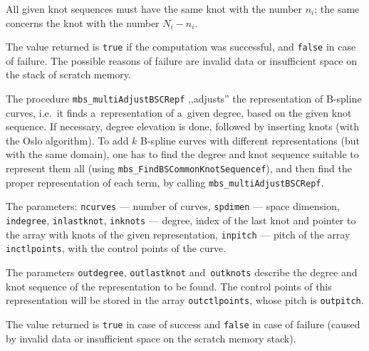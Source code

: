 All given knot sequences must have the same knot with the number $n_i$;
the same concerns the knot with the number $N_i-n_i$.

The value returned is \texttt{true} if the computation was successful,
and \texttt{false} in case of failure. The possible reasons of failure are
invalid data or insufficient space on the stack of scratch memory.

\vspace{\bigskipamount}
The procedure \texttt{mbs\_multiAdjustBSCRepf} ,,adjusts'' the
representation of B-spline curves, i.e.\ it finds a~representation of
a~given degree, based on the given knot sequence. If necessary,
degree elevation is done, followed by inserting knots (with the Oslo
algorithm). To add $k$ B-spline curves with different representations
(but with the same domain), one has to find the degree and knot sequence
suitable to represent them all (using
\texttt{mbs\_FindBSCommonKnotSequencef}), and then find the proper
representation of each term, by calling
\texttt{mbs\_multiAdjustBSCRepf}.

The parameters: \texttt{ncurves} --- number of curves, \texttt{spdimen} ---
space dimension, \texttt{indegree}, \texttt{inlastknot},
\texttt{inknots} --- degree, index of the last knot and pointer to the array
with knots of the given representation, \texttt{inpitch} --- pitch of the
array \texttt{inctlpoints}, with the control points of the curve.

The parameters \texttt{outdegree}, \texttt{outlastknot} and~\texttt{outknots}
describe the degree and knot sequence of the representation to be found.
The control points of this representation will be stored in the array
\texttt{outctlpoints}, whose pitch is \texttt{outpitch}.

The value returned is \texttt{true} in case of success and \texttt{false}
in case of failure (caused by invalid data or insufficient space on the
scratch memory stack).

